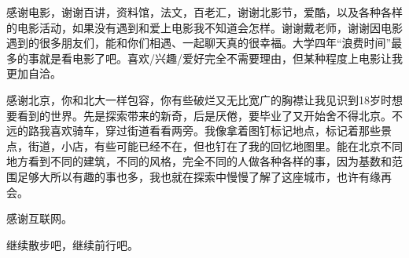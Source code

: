 感谢电影，谢谢百讲，资料馆，法文，百老汇，谢谢北影节，爱酷，以及各种各样的电影活动，如果没有遇到和爱上电影我不知道会怎样。谢谢戴老师，谢谢因电影遇到的很多朋友们，能和你们相遇、一起聊天真的很幸福。大学四年“浪费时间”最多的事就是看电影了吧。喜欢/兴趣/爱好完全不需要理由，但某种程度上电影让我更加自洽。

感谢北京，你和北大一样包容，你有些破烂又无比宽广的胸襟让我见识到18岁时想要看到的世界。先是探索带来的新奇，后是厌倦，要毕业了又开始舍不得北京。不远的路我喜欢骑车，穿过街道看看两旁。我像拿着图钉标记地点，标记着那些景点，街道，小店，有些可能已经不在，但也钉在了我的回忆地图里。能在北京不同地方看到不同的建筑，不同的风格，完全不同的人做各种各样的事，因为基数和范围足够大所以有趣的事也多，我也就在探索中慢慢了解了这座城市，也许有缘再会。

感谢互联网。

继续散步吧，继续前行吧。
